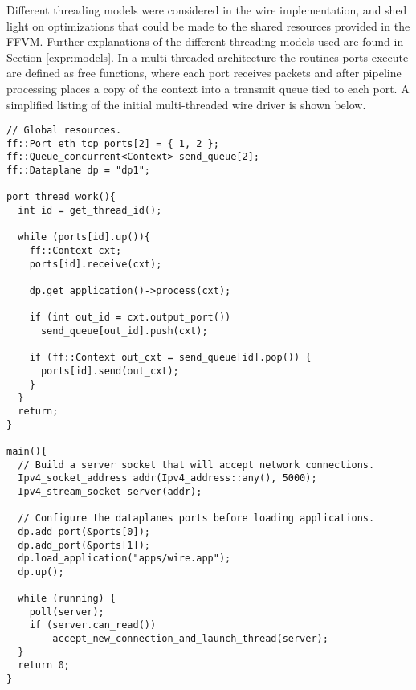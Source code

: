 Different threading models were considered in the wire implementation, and shed
light on optimizations that could be made to the shared resources provided in
the FFVM. Further explanations of the different threading models used are found
in Section \ref{expr:models}. In a multi-threaded architecture the routines
ports execute are defined as free functions, where each port receives packets
and after pipeline processing places a copy of the context into a transmit queue
tied to each port. A simplified listing of the initial multi-threaded wire
driver is shown below.

\begin{lstlisting}
// Global resources.
ff::Port_eth_tcp ports[2] = { 1, 2 };
ff::Queue_concurrent<Context> send_queue[2];
ff::Dataplane dp = "dp1";

port_thread_work(){
  int id = get_thread_id();

  while (ports[id].up()){
    ff::Context cxt;
    ports[id].receive(cxt);

    dp.get_application()->process(cxt);

    if (int out_id = cxt.output_port())
      send_queue[out_id].push(cxt);

    if (ff::Context out_cxt = send_queue[id].pop()) {
      ports[id].send(out_cxt);
    }
  }
  return;
}

main(){
  // Build a server socket that will accept network connections.
  Ipv4_socket_address addr(Ipv4_address::any(), 5000);
  Ipv4_stream_socket server(addr);

  // Configure the dataplanes ports before loading applications.
  dp.add_port(&ports[0]);
  dp.add_port(&ports[1]);
  dp.load_application("apps/wire.app");
  dp.up();

  while (running) {
  	poll(server);
  	if (server.can_read())
  		accept_new_connection_and_launch_thread(server);
  }
  return 0;
}
\end{lstlisting}

